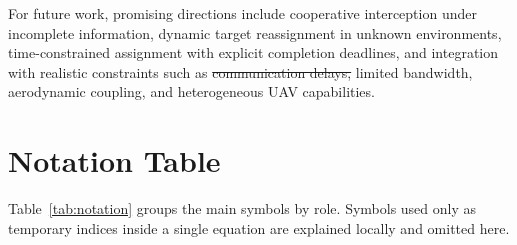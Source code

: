 \documentclass[lettersize,journal]{IEEEtran}
\providecommand{\DIFadd}[1]{{\protect\color{blue}#1}} %
\providecommand{\DIFdel}[1]{{\protect\color{red}\sout{#1}}}                      %
\providecommand{\DIFaddbegin}{} %
\providecommand{\DIFaddend}{} %
\providecommand{\DIFdelbegin}{} %
\providecommand{\DIFdelend}{} %
\newcommand{\DIFscaledelfig}{0.5}
\newlength{\DIFdelgraphicswidth} %
\newlength{\DIFdelgraphicsheight} %
\newcommand{\DIFaddincludegraphics}[2][]{{\color{blue}\fbox{\DIFOincludegraphics[#1]{#2}}}} %
\newcommand{\DIFdelincludegraphics}[2][]{%
\sbox{\DIFdelgraphicsbox}{\DIFOincludegraphics[#1]{#2}}%
\settoboxwidth{\DIFdelgraphicswidth}{\DIFdelgraphicsbox} %
\settoboxtotalheight{\DIFdelgraphicsheight}{\DIFdelgraphicsbox} %
\scalebox{\DIFscaledelfig}{%
\parbox[b]{\DIFdelgraphicswidth}{\usebox{\DIFdelgraphicsbox}\\[-\baselineskip] \rule{\DIFdelgraphicswidth}{0em}}\llap{\resizebox{\DIFdelgraphicswidth}{\DIFdelgraphicsheight}{%
\setlength{\unitlength}{\DIFdelgraphicswidth}%
\begin{picture}(1,1)%
\thicklines\linethickness{2pt} %
{\color[rgb]{1,0,0}\put(0,0){\framebox(1,1){}}}%
{\color[rgb]{1,0,0}\put(0,0){\line( 1,1){1}}}%
{\color[rgb]{1,0,0}\put(0,1){\line(1,-1){1}}}%
\end{picture}%
}\hspace*{3pt}}} %
} %
\DeclareRobustCommand{\DIFaddbegin}{\DIFOaddbegin \let\includegraphics\DIFaddincludegraphics} %
\DeclareRobustCommand{\DIFaddend}{\DIFOaddend \let\includegraphics\DIFOincludegraphics} %
\DeclareRobustCommand{\DIFdelbegin}{\DIFOdelbegin \let\includegraphics\DIFdelincludegraphics} %
\DeclareRobustCommand{\DIFdelend}{\DIFOaddend \let\includegraphics\DIFOincludegraphics} %
\begin{document}
For future work, promising directions include cooperative interception under incomplete
information, dynamic target reassignment in unknown environments, time-constrained assignment
with explicit completion deadlines, and integration with realistic constraints such as
\DIFdelbegin \DIFdel{communication delays, }\DIFdelend limited bandwidth, \DIFaddbegin \DIFadd{aerodynamic coupling, }\DIFaddend and heterogeneous UAV capabilities.



\DIFaddbegin 

\appendices
\section{\DIFadd{Notation Table}}
\label{app:notation}

\DIFadd{Table~\ref{tab:notation} groups the main symbols by role. Symbols used only as temporary
indices inside a single equation are explained locally and omitted here.
}
\end{document}
